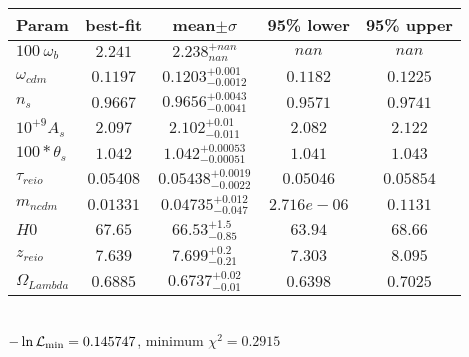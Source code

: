 \begin{tabular}{|l|c|c|c|c|} 
 \hline 
Param & best-fit & mean$\pm\sigma$ & 95\% lower & 95\% upper \\ \hline 
$100~\omega{}_{b }$ &$2.241$ & $2.238_{nan}^{+nan}$ & $nan$ & $nan$ \\ 
$\omega{}_{cdm }$ &$0.1197$ & $0.1203_{-0.0012}^{+0.001}$ & $0.1182$ & $0.1225$ \\ 
$n_{s }$ &$0.9667$ & $0.9656_{-0.0041}^{+0.0043}$ & $0.9571$ & $0.9741$ \\ 
$10^{+9}A_{s }$ &$2.097$ & $2.102_{-0.011}^{+0.01}$ & $2.082$ & $2.122$ \\ 
$100*\theta{}_{s }$ &$1.042$ & $1.042_{-0.00051}^{+0.00053}$ & $1.041$ & $1.043$ \\ 
$\tau{}_{reio }$ &$0.05408$ & $0.05438_{-0.0022}^{+0.0019}$ & $0.05046$ & $0.05854$ \\ 
$m_{ncdm }$ &$0.01331$ & $0.04735_{-0.047}^{+0.012}$ & $2.716e-06$ & $0.1131$ \\ 
$H0$ &$67.65$ & $66.53_{-0.85}^{+1.5}$ & $63.94$ & $68.66$ \\ 
$z_{reio }$ &$7.639$ & $7.699_{-0.21}^{+0.2}$ & $7.303$ & $8.095$ \\ 
$\Omega{}_{Lambda }$ &$0.6885$ & $0.6737_{-0.01}^{+0.02}$ & $0.6398$ & $0.7025$ \\ 
\hline 
 \end{tabular} \\ 
$-\ln{\cal L}_\mathrm{min} =0.145747$, minimum $\chi^2=0.2915$ \\ 
